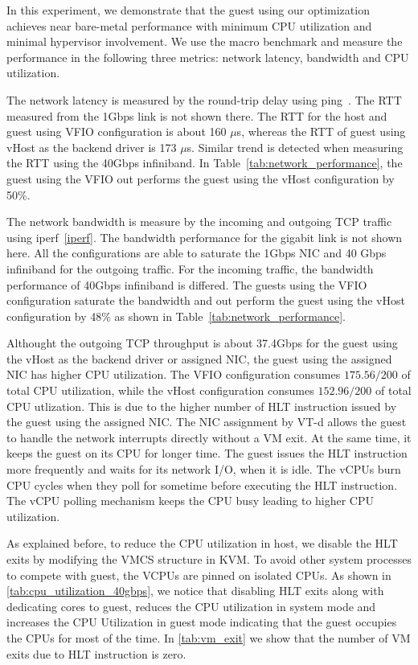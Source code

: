 In this experiment, we demonstrate that the guest using our
optimization achieves near bare-metal performance with minimum
CPU utilization and minimal hypervisor involvement. We use the
macro benchmark and measure the performance in the following
three metrics: network latency, bandwidth and CPU utilization.

The network latency is measured by the round-trip delay using
ping~\cite{ping}. The RTT measured from the 1Gbps link is not
shown there. The RTT for the host and guest using VFIO
configuration is about 160 $\mu$s, whereas the RTT of guest
using vHost as the backend driver is 173 $\mu$s. Similar trend
is detected when measuring the RTT using the 40Gbps
infiniband. In Table~\ref{tab:network_performance}, the guest
using the VFIO out performs the guest using the vHost
configuration by 50\%.

The network bandwidth is measure by the incoming and outgoing
TCP traffic using iperf~\ref{iperf}. The bandwidth performance
for the gigabit link is not shown here. All the configurations
are able to saturate the 1Gbps NIC and 40 Gbps infiniband for
the outgoing traffic. For the incoming traffic, the bandwidth
performance of 40Gbps infiniband is differed. The guests using
the VFIO configuration saturate the bandwidth and out perform
the guest using the vHost configuration by 48\% as shown in
Table~\ref{tab:network_performance}.

Althought the outgoing TCP throughput is about 37.4Gbps for
the guest using the vHost as the backend driver or assigned
NIC, the guest using the assigned NIC has higher CPU
utilization. The VFIO configuration consumes $175.56/200$ of
total CPU utilization, while the vHost configuration consumes
$152.96/200$ of total CPU utlization. This is due to the
higher number of HLT instruction issued by the guest using the
assigned NIC. The NIC assignment by VT-d allows the guest to
handle the network interrupts directly without a VM exit. At
the same time, it keeps the guest on its CPU for longer time.
The guest issues the HLT instruction more frequently and waits
for its network I/O, when it is idle. The vCPUs burn CPU
cycles when they poll for sometime before executing the HLT
instruction. The vCPU polling mechanism keeps the CPU busy
leading to higher CPU utilization.

As explained before, to reduce the CPU utilization in host, we
disable the HLT exits by modifying the VMCS structure in KVM.
To avoid other system processes to compete with guest, the
VCPUs are pinned on isolated CPUs. As shown in
\ref{tab:cpu_utilization_40gbps}, we notice that disabling HLT
exits along with dedicating cores to guest, reduces the CPU
utilization in system mode and increases the CPU Utilization
in guest mode indicating that the guest occupies the CPUs for
most of the time. In \ref{tab:vm_exit} we show that the number
of VM exits due to HLT instruction is zero.
